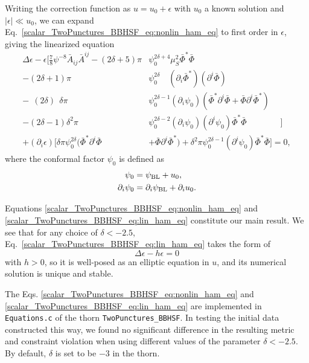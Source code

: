 Writing the correction function as $u = u_0 + \epsilon$ with $u_0$ a known solution
and $|\epsilon|\ll u_0$, 
we can expand Eq.~\eqref{scalar_TwoPunctures_BBHSF_eq:nonlin_ham_eq}
to first order in $\epsilon$, giving
the linearized equation
\begin{align}
    \Delta\epsilon
    - \epsilon
    \Bigg[
        \frac{7}{8} \psi^{-8} \bar{A}_{ij} \bar{A}^{ij}
        - (2\delta + 5) \pi
        &\psi_0^{2\delta + 4}
        \mu_S^2 \bar{\Phi}^* \bar{\Phi}
        \nonumber
        \\
        - (2\delta + 1) \pi
        &\psi_0^{2\delta}\quad
        (\partial_i\bar{\Phi}^*)
        (\partial^i\bar{\Phi})
        \nonumber
        \\
        -\ \ (2\delta)\ \ \delta \pi
        &\psi_0^{2\delta-1} (\partial_i\psi_0)
        ( \bar{\Phi}^* \partial^i\bar{\Phi}
        + \bar{\Phi} \partial^i\bar{\Phi}^* )
        \nonumber
        \\
        - (2\delta-1) \delta^2 \pi
        &\psi_0^{2\delta-2}
        (\partial_i\psi_0) (\partial^i\psi_0)
        \bar{\Phi}^* \bar{\Phi}
    \quad\quad\quad\quad\Big]
    \nonumber
    \\
    + (\partial_i\epsilon)
    \Big[
        \delta \pi \psi_0^{2\delta}
        ( \bar{\Phi}^* \partial^i\bar{\Phi}
        &+ \bar{\Phi} \partial^i\bar{\Phi}^* )
        +
        \delta^2 \pi \psi_0^{2\delta-1} (\partial^i\psi_0)
        \bar{\Phi}^* \bar{\Phi}
    \Big]= 0,
    \label{scalar_TwoPunctures_BBHSF_eq:lin_ham_eq}
\end{align}
where the conformal factor $\psi_0$ is defined as
\begin{align}
    \psi_0
    &= \psi_{\rm BL} + u_0,
    \\
    \partial_i \psi_0
    &= \partial_i \psi_{\rm BL}
    + \partial_i u_0.
\end{align}

Equations \eqref{scalar_TwoPunctures_BBHSF_eq:nonlin_ham_eq} and
\eqref{scalar_TwoPunctures_BBHSF_eq:lin_ham_eq} constitute our main result.
We see that for any choice of $\delta < -2.5$,
Eq.~\eqref{scalar_TwoPunctures_BBHSF_eq:lin_ham_eq} takes the form of 
\begin{equation}
    \Delta \epsilon - h \epsilon = 0
\end{equation}
with $h>0$,
so it is well-posed as an elliptic equation in $u$,
and its numerical solution is unique and stable.

The Eqs. \eqref{scalar_TwoPunctures_BBHSF_eq:nonlin_ham_eq} and
\eqref{scalar_TwoPunctures_BBHSF_eq:lin_ham_eq}
are implemented in \texttt{Equations.c} of the thorn \texttt{TwoPunctures\_BBHSF}.
In testing the initial data constructed this way, we found no significant difference in
the resulting metric and constraint violation when using different values of
the parameter $\delta < -2.5$.
By default, $\delta$ is set to be $-3$ in the thorn.


